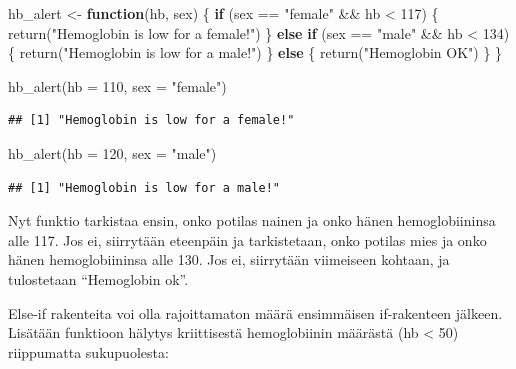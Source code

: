 \documentclass[
]{book}
\newenvironment{Shaded}{\begin{snugshade}}{\end{snugshade}}
\newcommand{\AttributeTok}[1]{\textcolor[rgb]{0.77,0.63,0.00}{#1}}
\newcommand{\ControlFlowTok}[1]{\textcolor[rgb]{0.13,0.29,0.53}{\textbf{#1}}}
\newcommand{\DecValTok}[1]{\textcolor[rgb]{0.00,0.00,0.81}{#1}}
\newcommand{\FunctionTok}[1]{\textcolor[rgb]{0.00,0.00,0.00}{#1}}
\newcommand{\NormalTok}[1]{#1}
\newcommand{\OtherTok}[1]{\textcolor[rgb]{0.56,0.35,0.01}{#1}}
\newcommand{\SpecialCharTok}[1]{\textcolor[rgb]{0.00,0.00,0.00}{#1}}
\newcommand{\StringTok}[1]{\textcolor[rgb]{0.31,0.60,0.02}{#1}}
\begin{document}
\begin{Shaded}
\begin{Highlighting}[]
\NormalTok{hb\_alert }\OtherTok{\textless{}{-}} \ControlFlowTok{function}\NormalTok{(hb, sex) \{}
  \ControlFlowTok{if}\NormalTok{ (sex }\SpecialCharTok{==} \StringTok{"female"} \SpecialCharTok{\&\&}\NormalTok{ hb }\SpecialCharTok{\textless{}} \DecValTok{117}\NormalTok{) \{}
    \FunctionTok{return}\NormalTok{(}\StringTok{"Hemoglobin is low for a female!"}\NormalTok{)}
\NormalTok{  \} }\ControlFlowTok{else} \ControlFlowTok{if}\NormalTok{ (sex }\SpecialCharTok{==} \StringTok{"male"} \SpecialCharTok{\&\&}\NormalTok{ hb }\SpecialCharTok{\textless{}} \DecValTok{134}\NormalTok{) \{}
    \FunctionTok{return}\NormalTok{(}\StringTok{"Hemoglobin is low for a male!"}\NormalTok{)}
\NormalTok{  \} }\ControlFlowTok{else}\NormalTok{ \{}
    \FunctionTok{return}\NormalTok{(}\StringTok{"Hemoglobin OK"}\NormalTok{)}
\NormalTok{  \}}
\NormalTok{\}}

\FunctionTok{hb\_alert}\NormalTok{(}\AttributeTok{hb =} \DecValTok{110}\NormalTok{, }\AttributeTok{sex =} \StringTok{"female"}\NormalTok{)}
\end{Highlighting}
\end{Shaded}

\begin{verbatim}
## [1] "Hemoglobin is low for a female!"
\end{verbatim}

\begin{Shaded}
\begin{Highlighting}[]
\FunctionTok{hb\_alert}\NormalTok{(}\AttributeTok{hb =} \DecValTok{120}\NormalTok{, }\AttributeTok{sex =} \StringTok{"male"}\NormalTok{)}
\end{Highlighting}
\end{Shaded}

\begin{verbatim}
## [1] "Hemoglobin is low for a male!"
\end{verbatim}

Nyt funktio tarkistaa ensin, onko potilas nainen ja onko hänen hemoglobiininsa alle 117. Jos ei, siirrytään eteenpäin ja tarkistetaan, onko potilas mies ja onko hänen hemoglobiininsa alle 130. Jos ei, siirrytään viimeiseen kohtaan, ja tulostetaan ``Hemoglobin ok''.

Else-if rakenteita voi olla rajoittamaton määrä ensimmäisen if-rakenteen jälkeen. Lisätään funktioon hälytys kriittisestä hemoglobiinin määrästä (hb \textless{} 50) riippumatta sukupuolesta:
\end{document}
